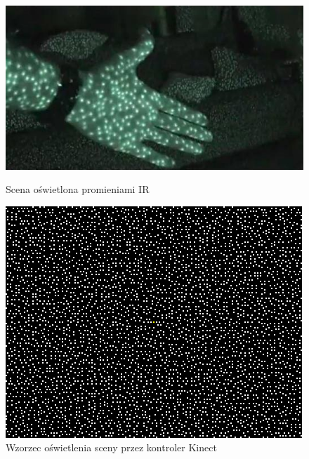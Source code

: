 \begin{savenotes}
	\begin{figure}
		\centering
		\begin{minipage}[b]{0.48\linewidth}
			\centering   
			\includegraphics[width=\textwidth]{images/kinectNightVision.jpg}	
			\caption[Scena oświetlona promieniami IR]{Scena oświetlona promieniami IR}
			\label{fig:characteristics:kinect:nightVision}
		\end{minipage}
		\begin{minipage}[b]{0.48\linewidth}
			\centering 
			\includegraphics[width=\textwidth]{images/kinect-pattern_3x3.png}
			\caption[Wzorzec oświetlenia sceny przez kontroler Kinect]{Wzorzec oświetlenia sceny przez kontroler Kinect }
			\label{fig:characteristics:kinect:dotPattern}
		\end{minipage}	
	\end{figure}
\end{savenotes}
																																	
